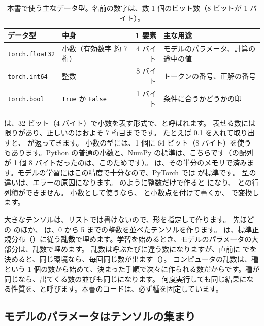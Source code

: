 \begin{table}[tbp]
\centering
\caption{本書で使う主なデータ型。名前の数字は、数 1 個のビット数（8 ビットが 1 バイト）。}
\label{tab:pt-dtype}
\small
\begin{tabular}{@{}llrl@{}}
\toprule
データ型 & 中身 & 1 要素 & 主な用途 \\
\midrule
\texttt{torch.float32} & 小数（有効数字 約 7 桁） & 4 バイト & モデルのパラメータ、計算の途中の値 \\
\texttt{torch.int64} & 整数 & 8 バイト & トークンの番号、正解の番号 \\
\texttt{torch.bool} & \texttt{True} か \texttt{False} & 1 バイト & 条件に合うかどうかの印 \\
\bottomrule
\end{tabular}
\end{table}

 は、32 ビット（4 バイト）で小数を表す形式で、と呼ばれます。
表せる数には限りがあり、正しいのはおよそ 7 桁目までです。
たとえば 0.1 を入れて取り出すと、 が返ってきます。
小数の型には、1 個に 64 ビット（8 バイト）を使う  もあります。Python の普通の小数と、NumPy の標準は、こちらです（の配列が 1 個 8 バイトだったのは、このためです）。
 は、その半分のメモリで済みます。モデルの学習にはこの精度で十分なので、PyTorch では  が標準です。
型の違いは、エラーの原因になります。
 のように整数だけで作ると  になり、 との行列積ができません。
小数として使うなら、\code{[1.0, 2.0, 3.0]} と小数点を付けて書くか、 で変換します。

大きなテンソルは、リストでは書けないので、形を指定して作ります。
先ほどの  のほか、 は、0 から 5 までの整数を並べたテンソルを作ります。
 は、標準正規分布（）に従う\textbf{乱数}で埋めます。学習を始めるとき、モデルのパラメータの大部分は、乱数で埋めます。
乱数は呼ぶたびに違う数になりますが、直前に  でを決めると、同じ環境なら、毎回同じ数が出ます（）。
コンピュータの乱数は、種という 1 個の数から始めて、決まった手順で次々に作られる数だからです。種が同じなら、出てくる数の並びも同じになります。
何度実行しても同じ結果になる性質を、と呼びます。本書のコードは、必ず種を固定しています。

\subsection*{モデルのパラメータはテンソルの集まり}

